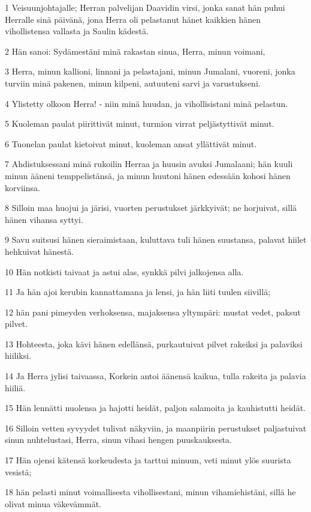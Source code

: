 \par 1 Veisuunjohtajalle; Herran palvelijan Daavidin virsi, jonka sanat hän  puhui Herralle sinä päivänä, jona Herra oli pelastanut hänet kaikkien  hänen vihollistensa vallasta ja Saulin kädestä.
\par 2 Hän sanoi: Sydämestäni minä rakastan sinua, Herra, minun voimani,
\par 3 Herra, minun kallioni, linnani ja pelastajani, minun Jumalani, vuoreni, jonka turviin minä pakenen, minun kilpeni, autuuteni sarvi ja varustukseni.
\par 4 Ylistetty olkoon Herra! - niin minä huudan, ja vihollisistani minä pelastun.
\par 5 Kuoleman paulat piirittivät minut, turmion virrat peljästyttivät minut.
\par 6 Tuonelan paulat kietoivat minut, kuoleman ansat yllättivät minut.
\par 7 Ahdistuksessani minä rukoilin Herraa ja huusin avuksi Jumalaani; hän kuuli minun ääneni temppelistänsä, ja minun huutoni hänen edessään kohosi hänen korviinsa.
\par 8 Silloin maa huojui ja järisi, vuorten perustukset järkkyivät; ne horjuivat, sillä hänen vihansa syttyi.
\par 9 Savu suitsusi hänen sieraimistaan, kuluttava tuli hänen suustansa, palavat hiilet hehkuivat hänestä.
\par 10 Hän notkisti taivaat ja astui alas, synkkä pilvi jalkojensa alla.
\par 11 Ja hän ajoi kerubin kannattamana ja lensi, ja hän liiti tuulen siivillä;
\par 12 hän pani pimeyden verhoksensa, majaksensa yltympäri: mustat vedet, paksut pilvet.
\par 13 Hohteesta, joka kävi hänen edellänsä, purkautuivat pilvet rakeiksi ja palaviksi hiiliksi.
\par 14 Ja Herra jylisi taivaassa, Korkein antoi äänensä kaikua, tulla rakeita ja palavia hiiliä.
\par 15 Hän lennätti nuolensa ja hajotti heidät, paljon salamoita ja kauhistutti heidät.
\par 16 Silloin vetten syvyydet tulivat näkyviin, ja maanpiirin perustukset paljastuivat sinun nuhtelustasi, Herra, sinun vihasi hengen puuskauksesta.
\par 17 Hän ojensi kätensä korkeudesta ja tarttui minuun, veti minut ylös suurista vesistä;
\par 18 hän pelasti minut voimallisesta vihollisestani, minun vihamiehistäni, sillä he olivat minua väkevämmät.
